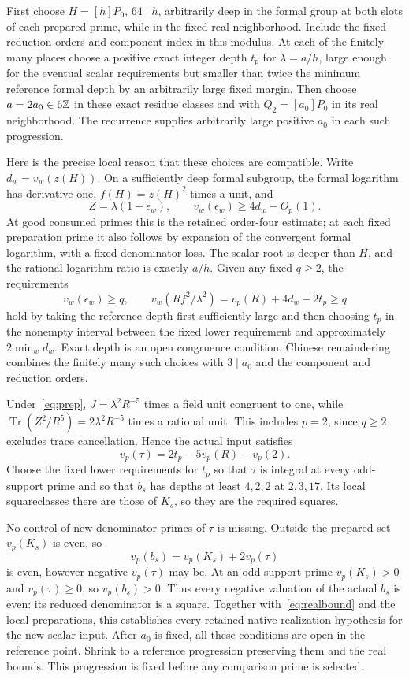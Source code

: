 \documentclass[11pt]{article}
\theoremstyle{remark}\newtheorem{remark}[theorem]{Remark}
\newcommand{\Tr}{\operatorname{Tr}}\newcommand{\Nm}{\operatorname{Nm}}
\begin{document}
First choose $H=[h]P_0$, $64\mid h$, arbitrarily deep in the
formal group at both slots of each prepared prime, while in the
fixed real neighborhood. Include the fixed reduction orders and
component index in this modulus. At each of the finitely many
places choose a positive exact integer depth $t_p$ for
$\lambda=a/h$, large enough for the eventual scalar requirements
but smaller than twice the minimum reference formal depth by an
arbitrarily large fixed margin. Then choose $a=2a_0\in6\mathbb Z$ in
these exact residue classes and with $Q_2=[a_0]P_0$ in its real
neighborhood. The recurrence supplies arbitrarily large positive
$a_0$ in each such progression.

Here is the precise local reason that these choices are compatible.
Write $d_w=v_w(z(H))$. On a sufficiently deep formal subgroup,
the formal logarithm has derivative one, $f(H)=z(H)^2$ times a
unit, and
\[
 Z=\lambda(1+\epsilon_w),\qquad
 v_w(\epsilon_w)\ge4d_w-O_p(1).
\]
At good consumed primes this is the retained order-four estimate;
at each fixed preparation prime it also follows by expansion of
the convergent formal logarithm, with a fixed denominator loss.
The scalar root is deeper than $H$, and the rational logarithm
ratio is exactly $a/h$. Given any fixed $q\ge2$, the requirements
\begin{equation}\label{eq:prep}
 v_w(\epsilon_w)\ge q,
 \qquad v_w(Rf^2/\lambda^2)=v_p(R)+4d_w-2t_p\ge q
\end{equation}
hold by taking the reference depth first sufficiently large and
then choosing $t_p$ in the nonempty interval between the fixed
lower requirement and approximately $2\min_w d_w$. Exact depth
is an open congruence condition. Chinese remaindering combines
the finitely many such choices with $3\mid a_0$ and the component
and reduction orders.

Under~\eqref{eq:prep}, $J=\lambda^2R^{-5}$ times a field unit
congruent to one, while
$\Tr(Z^2/R^5)=2\lambda^2R^{-5}$ times a rational unit.
This includes $p=2$, since $q\ge2$ excludes trace cancellation.
Hence the actual input satisfies
\begin{equation}\label{eq:taudepth}
                    v_p(\tau)=2t_p-5v_p(R)-v_p(2).
\end{equation}
Choose the fixed lower requirements for $t_p$ so that $\tau$ is
integral at every odd-support prime and so that $b_s$ has depths
at least $4,2,2$ at $2,3,17$. Its local squareclasses there are
those of $K_s$, so they are the required squares.

No control of new denominator primes of $\tau$ is missing.
Outside the prepared set $v_p(K_s)$ is even, so
\[
                     v_p(b_s)=v_p(K_s)+2v_p(\tau)
\]
is even, however negative $v_p(\tau)$ may be. At an odd-support
prime $v_p(K_s)>0$ and $v_p(\tau)\ge0$, so $v_p(b_s)>0$.
Thus every negative valuation of the actual $b_s$ is even: its
reduced denominator is a square. Together with~\eqref{eq:realbound}
and the local preparations, this establishes every retained native
realization hypothesis for the new scalar input.
After $a_0$ is fixed, all these conditions are open in the reference
point. Shrink to a reference progression preserving them and the
real bounds. This progression is fixed before any comparison
prime is selected.
\end{document}
